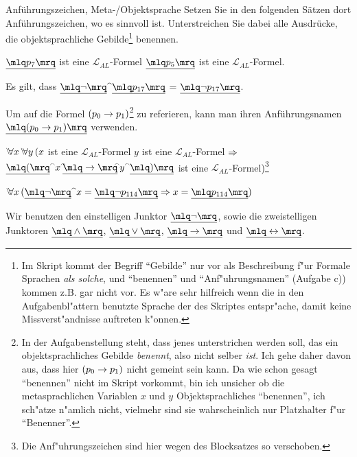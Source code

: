 \documentclass[a4paper,12pt]{scrartcl}
\begin{document}
\begin{task}{Anführungszeichen, Meta-/Objektsprache}
Setzen Sie in den folgenden Sätzen dort Anführungszeichen, wo es sinnvoll ist. Unterstreichen Sie dabei alle Ausdrücke, die objektsprachliche Gebilde\footnote{Im Skript kommt der Begriff "`Gebilde"' nur vor als Beschreibung f"ur Formale Sprachen \emph{als solche}, und "`benennen"' und "`Anf"uhrungsnamen"' (Aufgabe c)) kommen z.B. gar nicht vor. Es w"are sehr hilfreich wenn die in den Aufgabenbl"attern benutzte Sprache der des Skriptes entspr"ache, damit keine Missverst"andnisse auftreten k"onnen.} benennen.
\\
\begin{subtasks}
	\item $\underline{\mq{p_{7}}}$ ist eine $\mathcal{L}_{AL}$-Formel \Land $\underline{\mq{p_{5}}}$ ist eine $\mathcal{L}_{AL}$-Formel.
	\item Es gilt, dass $\underline{\mq{\neg}} \concat \underline{\mq{p_{17}}}$ = $\underline{\mq{\neg p_{17}}}$.
	\item Um auf die Formel $(p_{0} \rightarrow p_{1})$\footnote{In der Aufgabenstellung steht, dass jenes unterstrichen werden soll, das ein objektsprachliches Gebilde \emph{benennt}, also nicht selber \emph{ist}. Ich gehe daher davon aus, dass hier $(p_{0} \rightarrow p_{1})$ nicht gemeint sein kann. Da wie schon gesagt "`benennen"' nicht im Skript vorkommt, bin ich unsicher ob die metasprachlichen Variablen $x$ und $y$ Objektsprachliches "`benennen"', ich sch"atze n"amlich nicht, vielmehr sind sie wahrscheinlich nur Platzhalter f"ur "`Benenner"'.} zu referieren, kann man ihren Anführungsnamen $\underline{\mq{(p_{0} \then p_{1})}}$ verwenden.
	\item $\Forall x \, \Forall y \, (x$ ist eine $\mathcal{L}_{AL}$-Formel \Land $y$ ist eine $\mathcal{L}_{AL}$-Formel $\Rightarrow$ $ \underline{\mq{(}}  \concat x \concat \!\! \underline{\mq{\then}} \!\! \concat y \concat  \underline{\mq{)}} $ ist eine $\mathcal{L}_{AL}$-Formel)\footnote{Die Anf"uhrungszeichen sind hier wegen des Blocksatzes so verschoben.}
	\item $\Forall x \, (\underline{\mq{\neg}} \concat x = \underline{\mq{\neg p_{114}}}  \Then x=\underline{\mq{p_{114}}})$
	\item Wir benutzen den einstelligen Junktor $\underline{\mq{\neg}}$, sowie die zweistelligen Junktoren $\underline{\mq{\land}}$, $\underline{\mq{\lor}}$, $\underline{\mq{\then}}$ und $\underline{\mq{\eq}}$.
\end{subtasks}
\end{task}
\end{document}
